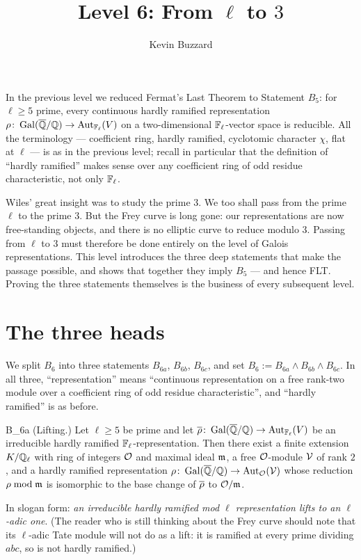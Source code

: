 \documentclass[11pt]{article}
\title{Level 6: From $\ell$ to $3$}
\author{Kevin Buzzard}
\date{}
\begin{document}
\maketitle

\noindent
In the previous level we reduced Fermat's Last Theorem to Statement $B_5$: for
$\ell\geq5$ prime, every continuous hardly ramified representation
$\rho\colon\operatorname{Gal}(\overline{\mathbb{Q}}/\mathbb{Q})\to\operatorname{Aut}_{\mathbb{F}_\ell}(V)$ on a two-dimensional $\mathbb{F}_\ell$-vector space
is reducible. All the terminology --- coefficient ring, hardly ramified,
cyclotomic character $\chi$, flat at $\ell$ --- is as in the previous level;
recall in particular that the definition of ``hardly ramified'' makes sense
over any coefficient ring of odd residue characteristic, not only $\mathbb{F}_\ell$.

\medskip\noindent
Wiles' great insight was to study the prime $3$. We too shall pass from the
prime $\ell$ to the prime $3$. But the Frey curve is long gone: our
representations are now free-standing objects, and there is no elliptic curve
to reduce modulo $3$. Passing from $\ell$ to $3$ must therefore be done
entirely on the level of Galois representations. This level introduces the
three deep statements that make the passage possible, and shows that together
they imply $B_5$ --- and hence FLT. Proving the three statements themselves is
the business of every subsequent level.

\section{The three heads}

We split $B_6$ into three statements $B_{6a}$, $B_{6b}$, $B_{6c}$, and set
$B_6:=B_{6a}\wedge B_{6b}\wedge B_{6c}$. In all three, ``representation'' means
``continuous representation on a free rank-two module over a coefficient ring
of odd residue characteristic'', and ``hardly ramified'' is as before.

\begin{Bn}{B_{6a}}
\textup{(Lifting.)} Let $\ell\geq5$ be prime and let
$\overline{\rho}\colon\operatorname{Gal}(\overline{\mathbb{Q}}/\mathbb{Q})\to\operatorname{Aut}_{\mathbb{F}_\ell}(V)$ be an irreducible hardly ramified
$\mathbb{F}_\ell$-representation. Then there exist a finite extension $K/\mathbb{Q}_\ell$ with ring
of integers $\mathcal{O}$ and maximal ideal $\mathfrak{m}$, a free $\mathcal{O}$-module $\mathcal{V}$ of
rank $2$, and a hardly ramified representation $\rho\colon\operatorname{Gal}(\overline{\mathbb{Q}}/\mathbb{Q})\to\operatorname{Aut}_{\mathcal{O}}(\mathcal{V})$
whose reduction $\rho\bmod\mathfrak{m}$ is isomorphic to the base change of $\overline{\rho}$ to
$\mathcal{O}/\mathfrak{m}$.
\end{Bn}

\noindent
In slogan form: \emph{an irreducible hardly ramified mod $\ell$ representation
lifts to an $\ell$-adic one}. (The reader who is still thinking about the Frey
curve should note that its $\ell$-adic Tate module will not do as a lift: it is
ramified at every prime dividing $abc$, so is not hardly ramified.)
\end{document}
